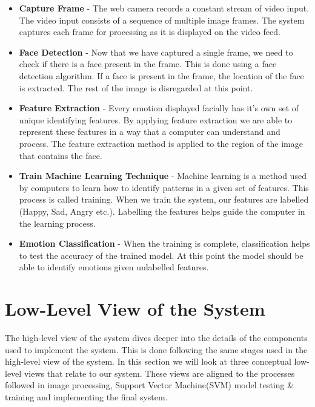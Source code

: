 \begin{itemize}
  \item \textbf{Capture Frame} - The web camera records a constant stream of video input. The video input consists of a sequence of multiple image frames. The system captures each frame for processing as it is displayed on the video feed.

  \item \textbf{Face Detection} - Now that we have captured a single frame, we need to check if there is a face present in the frame. This is done using a face detection algorithm. If a face is present in the frame, the location of the face is extracted. The rest of the image is disregarded at this point.

  \item \textbf{Feature Extraction} - Every emotion displayed facially has it's own set of unique identifying features. By applying feature extraction we are able to represent these features in a way that a computer can understand and process. The feature extraction method is applied to the region of the image that contains the face.

  \item \textbf{Train Machine Learning Technique} - Machine learning is a method used by computers to learn how to identify patterns in a given set of features. This process is called training. When we train the system, our features are labelled (Happy, Sad, Angry etc.). Labelling the features helps guide the computer in the learning process.

  \item \textbf{Emotion Classification} - When the training is complete, classification helps to test the accuracy of the trained model. At this point the model should be able to identify emotions given unlabelled features.
\end{itemize}

\section{Low-Level View of the System}
The high-level view of the system dives deeper into the details of the components used to implement the system. This is done following the same stages used in the high-level view of the system. In this section we will look at three conceptual low-level views that relate to our system. These views are aligned to the processes followed in image processing, Support Vector Machine(SVM) model testing \& training and implementing the final system.
